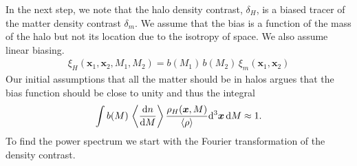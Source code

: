 \documentclass[../main.tex]{subfiles}
\begin{document}
In the next step, we note that the halo density contrast, $\delta_H$, is a biased tracer of the matter density contrast $\delta_m$. We assume that the bias is a function of the mass of the halo but not its location due to the isotropy of space. We also assume linear biasing. \begin{align*}
    \xi_H(\boldsymbol{x}_1,\boldsymbol{x}_2,M_1,M_2) = b(M_1)\,b(M_2)\,\xi_m(\boldsymbol{x}_1,\boldsymbol{x}_2)
\end{align*}
Our initial assumptions that all the matter should be in halos argues that the bias function should be close to unity and thus the integral 
\begin{equation}
\int b(M)\,\left\langle\frac{\mathrm{d} n}{\mathrm{d} M}\right\rangle \frac{\rho_H(\boldsymbol{x},M)}{\langle\rho\rangle} \mathrm{d}^3\boldsymbol{x}\,\mathrm{d} M \approx 1. \label{eq:two-halo-integral}
\end{equation}
To find the power spectrum we start with the Fourier transformation of the density contrast.
\end{document}
